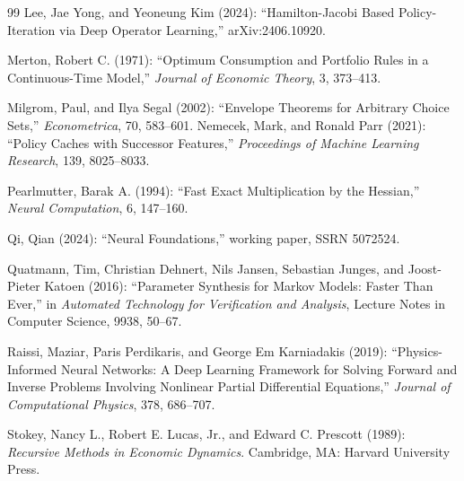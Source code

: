 \begin{thebibliography}{99}
Lee, Jae Yong, and Yeoneung Kim (2024): ``Hamilton-Jacobi Based Policy-Iteration via Deep Operator Learning,'' arXiv:2406.10920.

Merton, Robert C. (1971): ``Optimum Consumption and Portfolio Rules in a Continuous-Time Model,'' \emph{Journal of Economic Theory}, 3, 373--413.

Milgrom, Paul, and Ilya Segal (2002): ``Envelope Theorems for Arbitrary Choice Sets,'' \emph{Econometrica}, 70, 583--601.
Nemecek, Mark, and Ronald Parr (2021): ``Policy Caches with Successor Features,'' \emph{Proceedings of Machine Learning Research}, 139, 8025--8033.

Pearlmutter, Barak A. (1994): ``Fast Exact Multiplication by the Hessian,'' \emph{Neural Computation}, 6, 147--160.

Qi, Qian (2024): ``Neural Foundations,'' working paper, SSRN 5072524.

Quatmann, Tim, Christian Dehnert, Nils Jansen, Sebastian Junges, and Joost-Pieter Katoen (2016): ``Parameter Synthesis for Markov Models: Faster Than Ever,'' in \emph{Automated Technology for Verification and Analysis}, Lecture Notes in Computer Science, 9938, 50--67.

Raissi, Maziar, Paris Perdikaris, and George Em Karniadakis (2019): ``Physics-Informed Neural Networks: A Deep Learning Framework for Solving Forward and Inverse Problems Involving Nonlinear Partial Differential Equations,'' \emph{Journal of Computational Physics}, 378, 686--707.

Stokey, Nancy L., Robert E. Lucas, Jr., and Edward C. Prescott (1989): \emph{Recursive Methods in Economic Dynamics}. Cambridge, MA: Harvard University Press.

\par
\end{thebibliography}
